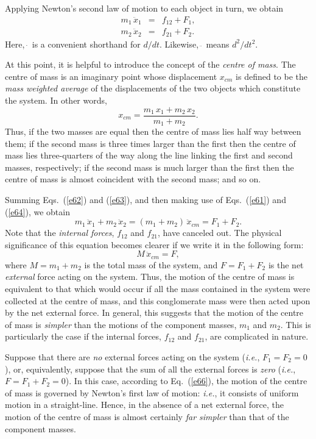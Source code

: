 Applying Newton's second law of motion to each object in turn, we obtain
\begin{eqnarray}
m_1\,\ddot{x}_1 &=& f_{12} + F_1,\label{e62}\\[0.5ex]
m_2\,\ddot{x}_2 &=& f_{21} + F_2.\label{e63}
\end{eqnarray}
Here, $\dot{~}$ is a convenient shorthand for $d/dt$. Likewise,
$\ddot{~}$ means $d^2/dt^2$.

At this point, it is helpful to introduce the concept of the {\em centre of mass}.
The centre of mass is an imaginary point whose displacement $x_{cm}$ is defined to be
the {\em mass weighted average}
of the displacements of the two objects which constitute the system. In
other words,
\begin{equation}
x_{cm} = \frac{m_1\,x_1 + m_2\,x_2}{m_1 + m_2}.\label{e64}
\end{equation}
Thus, if the two masses are equal then the centre of mass lies half way between them;
if the second mass is three times larger than the first then the centre
of mass lies three-quarters of the way along the line linking the first and second
masses, respectively; if the
second mass is much larger than the first then the centre of mass is almost
coincident with the second mass; and so on.

Summing Eqs.~(\ref{e62}) and (\ref{e63}), and then making use of Eqs.~(\ref{e61}) and (\ref{e64}),
we obtain
\begin{equation}
m_1\,\ddot{x}_1+m_2\,\ddot{x}_2 = (m_1+m_2)\,\ddot{x}_{cm} = F_1 + F_2.
\end{equation}
Note that the {\em internal forces}, $f_{12}$ and $f_{21}$, have canceled out.
The physical significance of this equation becomes clearer if we write it in the following
form:
\begin{equation}\label{e66}
M\,\ddot{x}_{cm} = F,
\end{equation}
where $M=m_1+m_2$ is the total mass of the system, and $F=F_1+F_2$ is the net
{\em external} force acting on the system. Thus, the motion of the centre of mass
is equivalent to that which would occur if all the mass contained in the system were collected
at the centre of mass, and this conglomerate mass were then acted upon by the
net external force. In general, this suggests that the motion of the centre
of mass is {\em  simpler} than the motions of the component masses, $m_1$ and
$m_2$. This is particularly the case if the internal forces, $f_{12}$ and $f_{21}$,
are complicated in nature.

Suppose that there are {\em no} external forces acting on the system ({\em i.e.}, $F_1=F_2=0$), or, 
equivalently, suppose
that the sum of all the external forces is {\em zero} ({\em i.e.}, $F=F_1+F_2=0$). 
In this case, according to Eq.~(\ref{e66}), the motion of the centre of mass is governed by
Newton's first law of motion: {\em i.e.}, it consists of uniform motion in a straight-line.
Hence, in the absence of a net external force, the motion of the centre of mass is
almost certainly {\em far simpler} than that of the component masses. 

